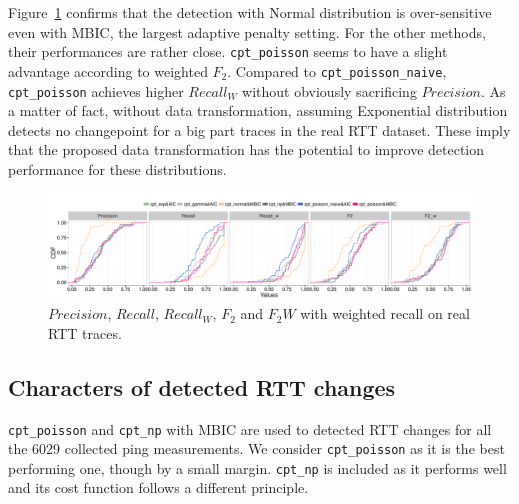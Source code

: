 Figure~\ref{fig:real_eval} confirms that the detection with Normal distribution is over-sensitive even with MBIC, the largest adaptive penalty setting. For the other methods, their performances are rather close. 
\texttt{cpt\_poisson} seems to have a slight advantage according to weighted $F_2$.
Compared to \texttt{cpt\_poisson\_naive}, \texttt{cpt\_poisson} achieves higher $Recall_W$ without obviously sacrificing $Precision$.
As a matter of fact, without data transformation, assuming Exponential distribution detects no changepoint for a big part traces in the real RTT dataset.
These imply that the proposed data transformation has the potential to improve detection performance for these distributions. 

\begin{landscape}
\begin{figure}[!ht]
\centering
\includegraphics[width=1.8\textwidth]{gfx/chap4/real_eval_bis.pdf}
\caption{$Precision$, $Recall$, $Recall_W$, $F_2$ and $F_2W$ with weighted recall on real RTT traces.}
\label{fig:real_eval}
\end{figure}
\end{landscape}

\subsection{Characters of detected RTT changes}
\label{sec:cpt_trace}
\texttt{cpt\_poisson} and \texttt{cpt\_np} with MBIC are used to detected RTT changes for all the 6029 collected ping measurements.
We consider \texttt{cpt\_poisson} as it is the best performing one, though by a small margin.
\texttt{cpt\_np} is included as it performs well and its cost function follows a different principle.


